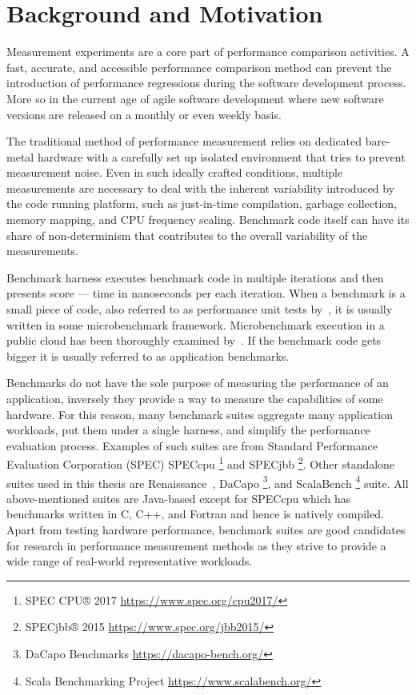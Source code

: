 \chapter{Background and Motivation}
\label{chap:background}

Measurement experiments are a core part of performance comparison activities.
A fast, accurate, and accessible performance comparison method can prevent the introduction of performance regressions during the software development process.
More so in the current age of agile software development where new software versions are released on a monthly or even weekly basis.

The traditional method of performance measurement relies on dedicated bare-metal hardware with a carefully set up isolated environment that tries to prevent measurement noise. 
Even in such ideally crafted conditions, multiple measurements are necessary to deal with the inherent variability introduced by the code running platform, such as just-in-time compilation, garbage collection, memory mapping, and CPU frequency scaling.
Benchmark code itself can have its share of non-determinism that contributes to the overall variability of the measurements.

Benchmark harness executes benchmark code in multiple iterations and then presents score --- time in nanoseconds per each iteration.
When a benchmark is a small piece of code, also referred to as performance unit tests by~\citet{horky2015unit}, it is usually written in some microbenchmark framework.
Microbenchmark execution in a public cloud has been thoroughly examined by~\citet{laaber2019software}.
If the benchmark code gets bigger it is usually referred to as application benchmarks.

Benchmarks do not have the sole purpose of measuring the performance of an application, inversely they provide a way to measure the capabilities of some hardware.
For this reason, many benchmark suites aggregate many application workloads, put them under a single harness, and simplify the performance evaluation process.
Examples of such suites are from Standard Performance Evaluation Corporation (SPEC) SPECcpu \footnote{SPEC CPU® 2017 \url{https://www.spec.org/cpu2017/}} and SPECjbb \footnote{SPECjbb® 2015 \url{https://www.spec.org/jbb2015/}}.
Other standalone suites used in this thesis are Renaissance~\cite{prokopec2019renaissance}, DaCapo \footnote{DaCapo Benchmarks \url{https://dacapo-bench.org/}}, and ScalaBench \footnote{Scala Benchmarking Project \url{https://www.scalabench.org/}} suite.
All above-mentioned suites are Java-based except for SPECcpu which has benchmarks written in C, C++, and Fortran and hence is natively compiled.
Apart from testing hardware performance, benchmark suites are good candidates for research in performance measurement methods as they strive to provide a wide range of real-world representative workloads.

